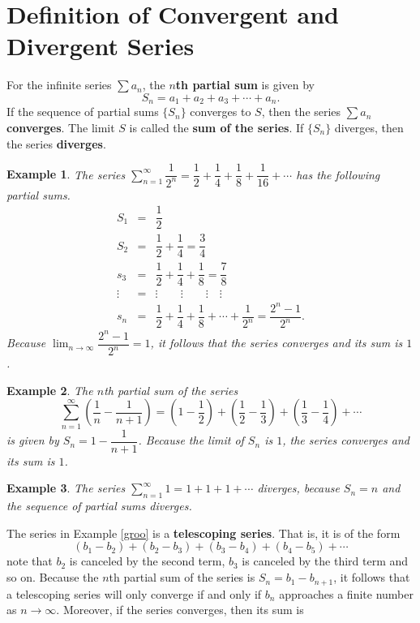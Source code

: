 \documentclass[titlepage,a4paper,12pt]{report}
\newtheorem{example}{Example}[section]
\begin{document}
\section{Definition of Convergent and Divergent Series}
For the infinite series $\displaystyle \sum a_n$, the \textbf{$n$th partial sum} is given by 
\[S_n=a_1+a_2+a_3+\cdots +a_n.\]
If the sequence of partial sums $\{S_n\}$ converges to $S$, then the series $\displaystyle \sum a_n$ \textbf{converges}. The limit $S$ is called the \textbf{sum of the series}. If $\{S_n\}$ diverges, then the series \textbf{diverges}.
\begin{example}
The series $\displaystyle \sum _{n=1}^\infty \dfrac{1}{2^n}=\dfrac{1}{2}+\dfrac{1}{4}+\dfrac{1}{8}+\dfrac{1}{16}+\cdots$ has the following partial sums.
\begin{eqnarray*}
S_1 &=& \dfrac{1}{2}\\
S_2 &=& \dfrac{1}{2}+\dfrac{1}{4}=\dfrac{3}{4} \\
s_3 &=& \dfrac{1}{2}+\dfrac{1}{4} +\dfrac{1}{8} = \dfrac{7}{8} \\
\vdots &=& \vdots \quad \quad \vdots \quad \quad \vdots \quad \vdots \\
s_n &=& \dfrac{1}{2}+\dfrac{1}{4} +\dfrac{1}{8} +\cdots + \dfrac{1}{2^n} =\dfrac{2^n-1}{2^n}.
\end{eqnarray*}
Because $\displaystyle \lim _{n\rightarrow \infty}\dfrac{2^n-1}{2^n}=1$, it follows that the series converges and its sum is $1$.
\end{example}
\begin{example}\label{groo}
The $n$th partial sum of the series 
\[\sum _{n=1}^\infty \left(\dfrac{1}{n}-\dfrac{1}{n+1}\right)=\left(1-\dfrac{1}{2}\right)+\left(\dfrac{1}{2}-\dfrac{1}{3}\right)+\left(\dfrac{1}{3}-\dfrac{1}{4}\right)+\cdots\] is given by $S_n=1-\dfrac{1}{n+1}$. Because the limit of $S_n$ is $1$, the series converges and its sum is $1$.
\end{example}
\begin{example}
The series $\displaystyle \sum _{n=1}^\infty 1 =1+1+1+\cdots$ diverges, because $S_n=n$ and the sequence of partial sums diverges.
\end{example}
\noindent The series in Example \eqref{groo} is a \textbf{telescoping series}. That is, it is of the form 
\[ (b_1-b_2)+(b_2-b_3)+(b_3-b_4)+(b_4-b_5)+\cdots \]
note that $b_2$ is canceled by the second term, $b_3$ is canceled by the third term and so on. Because the $n$th partial sum of the series is $S_n=b_1-b_{n+1}$, it follows that a telescoping series will only converge if and only if $b_n$ approaches a finite number as $n\rightarrow \infty$. Moreover, if the series converges, then its sum is 
\end{document}
